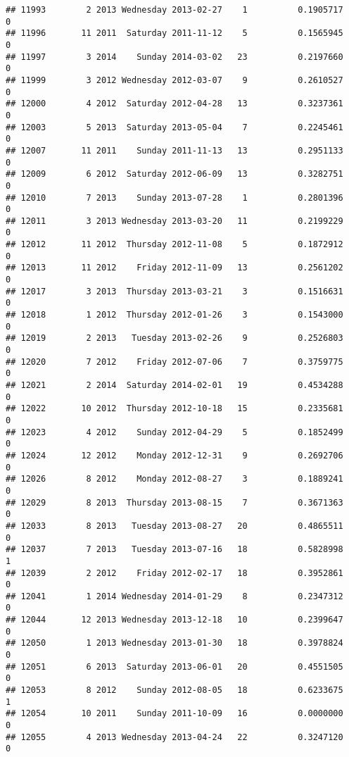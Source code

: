 \documentclass[
]{article}
\begin{document}
\begin{verbatim}
## 11993        2 2013 Wednesday 2013-02-27    1          0.1905717             0
## 11996       11 2011  Saturday 2011-11-12    5          0.1565945             0
## 11997        3 2014    Sunday 2014-03-02   23          0.2197660             0
## 11999        3 2012 Wednesday 2012-03-07    9          0.2610527             0
## 12000        4 2012  Saturday 2012-04-28   13          0.3237361             0
## 12003        5 2013  Saturday 2013-05-04    7          0.2245461             0
## 12007       11 2011    Sunday 2011-11-13   13          0.2951133             0
## 12009        6 2012  Saturday 2012-06-09   13          0.3282751             0
## 12010        7 2013    Sunday 2013-07-28    1          0.2801396             0
## 12011        3 2013 Wednesday 2013-03-20   11          0.2199229             0
## 12012       11 2012  Thursday 2012-11-08    5          0.1872912             0
## 12013       11 2012    Friday 2012-11-09   13          0.2561202             0
## 12017        3 2013  Thursday 2013-03-21    3          0.1516631             0
## 12018        1 2012  Thursday 2012-01-26    3          0.1543000             0
## 12019        2 2013   Tuesday 2013-02-26    9          0.2526803             0
## 12020        7 2012    Friday 2012-07-06    7          0.3759775             0
## 12021        2 2014  Saturday 2014-02-01   19          0.4534288             0
## 12022       10 2012  Thursday 2012-10-18   15          0.2335681             0
## 12023        4 2012    Sunday 2012-04-29    5          0.1852499             0
## 12024       12 2012    Monday 2012-12-31    9          0.2692706             0
## 12026        8 2012    Monday 2012-08-27    3          0.1889241             0
## 12029        8 2013  Thursday 2013-08-15    7          0.3671363             0
## 12033        8 2013   Tuesday 2013-08-27   20          0.4865511             0
## 12037        7 2013   Tuesday 2013-07-16   18          0.5828998             1
## 12039        2 2012    Friday 2012-02-17   18          0.3952861             0
## 12041        1 2014 Wednesday 2014-01-29    8          0.2347312             0
## 12044       12 2013 Wednesday 2013-12-18   10          0.2399647             0
## 12050        1 2013 Wednesday 2013-01-30   18          0.3978824             0
## 12051        6 2013  Saturday 2013-06-01   20          0.4551505             0
## 12053        8 2012    Sunday 2012-08-05   18          0.6233675             1
## 12054       10 2011    Sunday 2011-10-09   16          0.0000000             0
## 12055        4 2013 Wednesday 2013-04-24   22          0.3247120             0

\end{verbatim}
\end{document}
